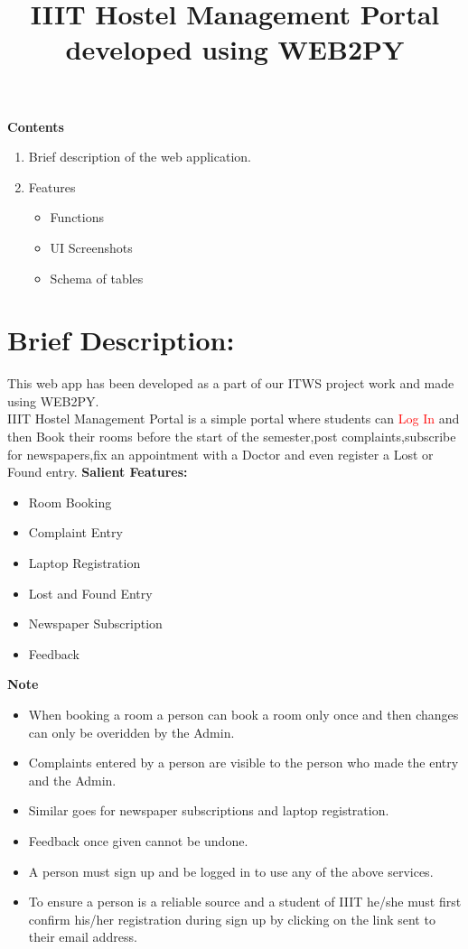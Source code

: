 \documentclass[a4paper,11pt]{article}
\title{\bfseries{IIIT Hostel Management Portal developed using WEB2PY}}
\begin{document}
\maketitle
{\Large{\bfseries Contents}}
\begin{enumerate}
	\item Brief description of the web application.
	\item Features
		\begin{itemize}
			\item Functions
			\item UI Screenshots
			\item Schema of tables
		\end{itemize}
\end{enumerate}
\newpage
\part{{\Large Brief Description:}}
This web app has been developed as a part of our ITWS project work and made using WEB2PY.
\newline
\\
IIIT Hostel Management Portal is a simple portal where students can \textcolor{red}{Log In} and then Book their rooms before the start of the semester,post complaints,subscribe for newspapers,fix an appointment with a Doctor and even register a Lost or Found entry.
\newline
\newline
{\Large{\bfseries Salient Features:}}
\begin{itemize}
	\item Room Booking
	\item Complaint Entry
	\item Laptop Registration
	\item Lost and Found Entry
	\item Newspaper Subscription
	\item Feedback
\end{itemize}

{\bfseries Note}
\begin{itemize}
	\item When booking a room a person can book a room only once and then changes can only be overidden by the Admin.
	\item Complaints entered by a person are visible to the person who made the entry and the Admin.
	\item Similar goes for newspaper subscriptions and laptop registration.
	\item Feedback once given cannot be undone.
	\item A person must sign up and be logged in to use any of the above services.
	\item To ensure a person is a reliable source and a student of IIIT he/she must first confirm his/her registration during sign up by clicking on the link sent to their email address.
\end{itemize}
\end{document}

